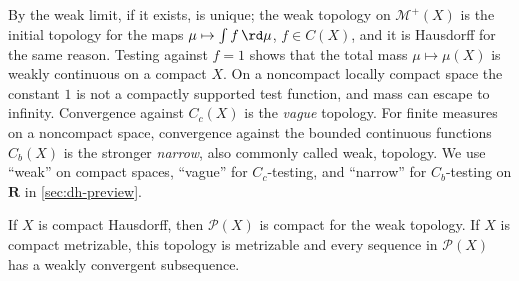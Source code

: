 By  the weak limit, if it exists, is unique; the
weak topology on $\mathcal M^+(X)$ is the initial topology for the maps
$\mu\mapsto\int f\,\rd\mu$, $f\in C(X)$, and it is Hausdorff for the same
reason.  Testing against $f=1$ shows that the total mass
$\mu\mapsto\mu(X)$ is weakly continuous on a compact $X$.  On a noncompact
locally compact space the constant $1$ is not a compactly supported test
function, and mass can escape to infinity.  Convergence against $C_c(X)$ is
the \emph{vague} topology.  For finite measures on a noncompact space,
convergence against the bounded continuous functions $C_b(X)$ is the stronger
\emph{narrow}, also commonly
called weak, topology.  We use ``weak'' on compact spaces, ``vague'' for
$C_c$-testing, and ``narrow'' for $C_b$-testing on $\mathbf R$ in
\cref{sec:dh-preview}.

\begin{proposition}\label{prop:measure-compactness}
If $X$ is compact Hausdorff, then $\mathcal P(X)$ is compact for the weak
topology.  If $X$ is compact metrizable, this topology is metrizable and every
sequence in $\mathcal P(X)$ has a weakly convergent subsequence.
\end{proposition}

